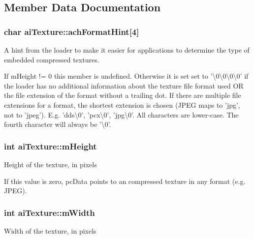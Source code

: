 \subsection{Member Data Documentation}
\hypertarget{structai_texture_aa9f44996acf3b301bfeb4e5348311540}{
\subsubsection[{ach\-Format\-Hint}]{\setlength{\rightskip}{0pt plus 5cm}char ai\-Texture\-::ach\-Format\-Hint\mbox{[}4\mbox{]}}}\label{structai_texture_aa9f44996acf3b301bfeb4e5348311540}
A hint from the loader to make it easier for applications to determine the type of embedded compressed textures.

If m\-Height != 0 this member is undefined. Otherwise it is set set to '\textbackslash{}0\textbackslash{}0\textbackslash{}0\textbackslash{}0' if the loader has no additional information about the texture file format used O\-R the file extension of the format without a trailing dot. If there are multiple file extensions for a format, the shortest extension is chosen (J\-P\-E\-G maps to 'jpg', not to 'jpeg'). E.\-g. 'dds\textbackslash{}0', 'pcx\textbackslash{}0', 'jpg\textbackslash{}0'. All characters are lower-\/case. The fourth character will always be '\textbackslash{}0'. \hypertarget{structai_texture_ac1e2fa6f1f646e9c55e3985d4418a752}{
\subsubsection[{m\-Height}]{ {\bf int} ai\-Texture\-::m\-Height}}\label{structai_texture_ac1e2fa6f1f646e9c55e3985d4418a752}
Height of the texture, in pixels

If this value is zero, pc\-Data points to an compressed texture in any format (e.\-g. J\-P\-E\-G). \hypertarget{structai_texture_aaa3ad8cfe44fdc4dea2db91977d92234}{
\subsubsection[{m\-Width}]{ {\bf int} ai\-Texture\-::m\-Width}}\label{structai_texture_aaa3ad8cfe44fdc4dea2db91977d92234}
Width of the texture, in pixels


